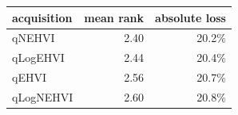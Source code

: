 \begin{tabular}{lrr}
\toprule
acquisition & mean rank & absolute loss \\
\midrule
qNEHVI & 2.40 & 20.2\% \\
qLogEHVI & 2.44 & 20.4\% \\
qEHVI & 2.56 & 20.7\% \\
qLogNEHVI & 2.60 & 20.8\% \\
\bottomrule
\end{tabular}
